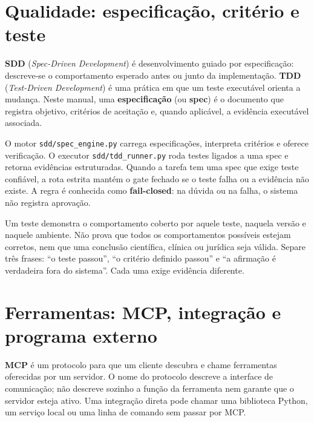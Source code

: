 \section{Qualidade: especificação, critério e teste}

\begin{conceito}
\textbf{SDD} (\emph{Spec-Driven Development}) é desenvolvimento guiado por
especificação: descreve-se o comportamento esperado antes ou junto da
implementação. \textbf{TDD} (\emph{Test-Driven Development}) é uma prática em
que um teste executável orienta a mudança. Neste manual, uma
\textbf{especificação} (ou \textbf{spec}) é o documento que registra objetivo,
critérios de aceitação e, quando aplicável, a evidência executável associada.
\end{conceito}

\begin{processo}
O motor \texttt{sdd/spec\_engine.py} carrega especificações, interpreta
critérios e oferece verificação. O executor \texttt{sdd/tdd\_runner.py} roda
testes ligados a uma spec e retorna evidências estruturadas. Quando a tarefa
tem uma spec que exige teste confiável, a rota estrita mantém o gate fechado se
o teste falha ou a evidência não existe. A regra é conhecida como
\textbf{fail-closed}: na dúvida ou na falha, o sistema não registra aprovação.
\end{processo}

\begin{aviso}
Um teste demonstra o comportamento coberto por aquele teste, naquela versão e
naquele ambiente. Não prova que todos os comportamentos possíveis estejam
corretos, nem que uma conclusão científica, clínica ou jurídica seja válida.
Separe três frases: ``o teste passou'', ``o critério definido passou'' e ``a
afirmação é verdadeira fora do sistema''. Cada uma exige evidência diferente.
\end{aviso}

\section{Ferramentas: MCP, integração e programa externo}

\begin{conceito}
\textbf{MCP} é um protocolo para que um cliente descubra e chame ferramentas
oferecidas por um servidor. O nome do protocolo descreve a interface de
comunicação; não descreve sozinho a função da ferramenta nem garante que o
servidor esteja ativo. Uma integração direta pode chamar uma biblioteca Python,
um serviço local ou uma linha de comando sem passar por MCP.
\end{conceito}

